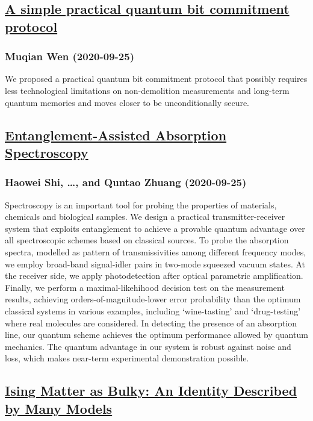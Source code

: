 \subsection*{\href{http://arxiv.org/abs/2009.13263v1}{A simple practical quantum bit commitment protocol}}
\subsubsection*{Muqian Wen (2020-09-25)}
We proposed a practical quantum bit commitment protocol that possibly
requires less technological limitations on non-demolition measurements and
long-term quantum memories and moves closer to be unconditionally secure.

\subsection*{\href{http://arxiv.org/abs/2009.12026v1}{Entanglement-Assisted Absorption Spectroscopy}}
\subsubsection*{Haowei Shi, \dots, and Quntao Zhuang (2020-09-25)}
Spectroscopy is an important tool for probing the properties of materials,
chemicals and biological samples. We design a practical transmitter-receiver
system that exploits entanglement to achieve a provable quantum advantage over
all spectroscopic schemes based on classical sources. To probe the absorption
spectra, modelled as pattern of transmissivities among different frequency
modes, we employ broad-band signal-idler pairs in two-mode squeezed vacuum
states. At the receiver side, we apply photodetection after optical parametric
amplification. Finally, we perform a maximal-likehihood decision test on the
measurement results, achieving orders-of-magnitude-lower error probability than
the optimum classical systems in various examples, including `wine-tasting' and
`drug-testing' where real molecules are considered. In detecting the presence
of an absorption line, our quantum scheme achieves the optimum performance
allowed by quantum mechanics. The quantum advantage in our system is robust
against noise and loss, which makes near-term experimental demonstration
possible.

\subsection*{\href{http://arxiv.org/abs/2009.12017v1}{Ising Matter as Bulky: An Identity Described by Many Models}}
